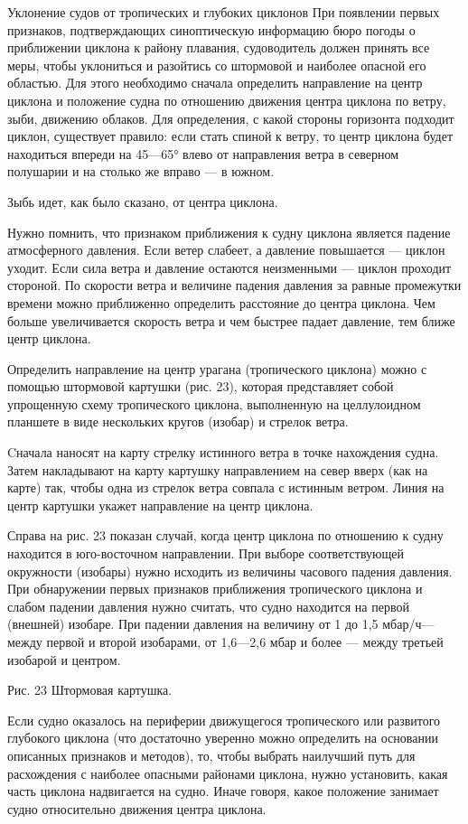 Уклонение судов от тропических и глубоких циклонов
При появлении первых признаков, подтверждающих синоптическую информацию бюро погоды о приближении циклона к району плавания, судоводитель должен принять все меры, чтобы уклониться и разойтись со штормовой и наиболее опасной его областью. Для этого необходимо сначала определить направление на центр циклона и положение судна по отношению движения центра циклона по ветру, зыби, движению облаков. Для определения, с какой стороны горизонта подходит циклон, существует правило: если стать спиной к ветру, то центр циклона будет находиться впереди на 45—65° влево от направления ветра в северном полушарии и на столько же вправо — в южном.

Зыбь идет, как было сказано, от центра циклона.

Нужно помнить, что признаком приближения к судну циклона является падение атмосферного давления. Если ветер слабеет, а давление повышается — циклон уходит. Если сила ветра и давление остаются неизменными — циклон проходит стороной. По скорости ветра и величине падения давления за равные промежутки времени можно приближенно определить расстояние до центра циклона. Чем больше увеличивается скорость ветра и чем быстрее падает давление, тем ближе центр циклона.

Определить направление на центр урагана (тропического циклона) можно с помощью штормовой картушки (рис. 23), которая представляет собой упрощенную схему тропического циклона, выполненную на целлулоидном планшете в виде нескольких кругов (изобар) и стрелок ветра.

Cначала наносят на карту стрелку истинного ветра в точке нахождения судна. Затем накладывают на карту картушку направлением на север вверх (как на карте) так, чтобы одна из стрелок ветра совпала с истинным ветром. Линия на центр картушки укажет направление на центр циклона.

Справа на рис. 23 показан случай, когда центр циклона по отношению к судну находится в юго-восточном направлении. При выборе соответствующей окружности (изобары) нужно исходить из величины часового падения давления. При обнаружении первых признаков приближения тропического циклона и слабом падении давления нужно считать, что судно находится на первой (внешней) изобаре. При падении давления на величину от 1 до 1,5 мбар/ч—между первой и второй изобарами, от 1,6—2,6 мбар и более — между третьей изобарой и центром.


Рис. 23 Штормовая картушка.

Если судно оказалось на периферии движущегося тропического или развитого глубокого циклона (что достаточно уверенно можно определить на основании описанных признаков и методов), то, чтобы выбрать наилучший путь для расхождения с наиболее опасными районами циклона, нужно установить, какая часть циклона надвигается на судно. Иначе говоря, какое положение занимает судно относительно движения центра циклона.

